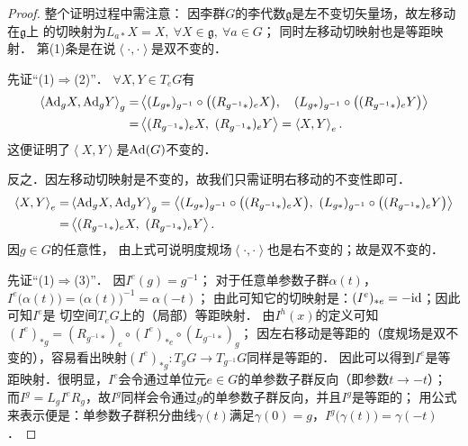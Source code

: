 \begin{proof}
    整个证明过程中需注意：
    因李群$G$的李代数$\mathfrak{g}$是左不变切矢量场，故左移动在$\mathfrak{g}$上
    的切映射为$L_{a*} X = X,\  \forall X\in \mathfrak{g},\ \forall a\in G$；
    同时左移动切映射也是等距映射．
    第(1)条是在说$\left<\cdot,\cdot\right>$是双不变的．
    
    先证“(1)$\Rightarrow$(2)”．    $\forall X,Y \in T_e G$有
    \begin{align*}
        \left<{\rm Ad}_{g} X, {\rm Ad}_{g} Y\right>_{g} =& 
        \left<(L_{g*})_{g^{-1}} \circ \bigl((R_{g^{-1}*})_{e} X\bigr) ,\quad 
        (L_{g*})_{g^{-1}} \circ \bigl((R_{g^{-1}*})_{e} Y\bigr)\right> \\
        =& \left<(R_{g^{-1}*})_{e} X,\ (R_{g^{-1}*})_{e} Y \right>
        =\left<X,Y\right>_e .
    \end{align*}
    这便证明了$\left<X,Y\right>$是${\rm Ad}(G)$不变的．
    
    反之．因左移动切映射是不变的，故我们只需证明右移动的不变性即可．
    \begin{align*}
        \left<X,Y\right>_e =& \left<{\rm Ad}_{g} X, {\rm Ad}_{g} Y\right>_{g} 
        =   \left<(L_{g*})_{g^{-1}} \circ \bigl((R_{g^{-1}*})_{e} X\bigr) ,\ 
        (L_{g*})_{g^{-1}} \circ \bigl((R_{g^{-1}*})_{e} Y\bigr)\right> \\
        =&\left<(R_{g^{-1}*})_{e} X,\ (R_{g^{-1}*})_{e} Y \right> .
    \end{align*}
    因$g\in G$的任意性，
    由上式可说明度规场$\left<\cdot,\cdot\right>$也是右不变的；故是双不变的．
    
    
    
    先证“(1)$\Rightarrow$(3)”．
    因$I^e(g)=g^{-1}$；    对于任意单参数子群$\alpha(t)$，
    $I^e\bigl(\alpha(t)\bigr) = \bigl(\alpha(t)\bigr)^{-1}=\alpha(-t)$；
    由此可知它的切映射是：$(I^e)_{*e}=-{\rm id}$；因此可知$I^e$是
    切空间$T_e G$上的（局部）等距映射．
    由$I^h(x)$的定义可知$(I^e)_{*g}= (R_{g^{-1}*})_e \circ (I^e)_{*e}\circ (L_{g^{-1}*})_g$；
    因左右移动是等距的（度规场是双不变的），容易看出映射$(I^e)_{*g}: T_g G \to T_{g^{-1}}G$同样是等距的．
    因此可以得到$I^e$是等距映射．很明显，$I^e$会令通过单位元$e\in G$的单参数子群反向（即参数$t\to -t$）；
    而$I^g=L_g I^e R_g$，故$I^g$同样会令通过$g$的单参数子群反向，并且$I^g$是等距的；
    用公式来表示便是：单参数子群积分曲线$\gamma(t)$满足$\gamma(0)=g$，$I^g\bigl(\gamma(t)\bigr) = \gamma(-t)$．
    

\end{proof}
